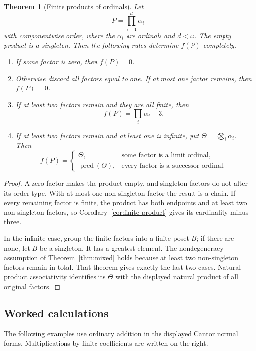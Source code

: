 \documentclass[11pt,letterpaper]{article}
\newtheorem{theorem}{Theorem}[section]
\theoremstyle{definition}
\theoremstyle{remark}
\newcommand{\pred}{\operatorname{pred}}
\begin{document}
\begin{theorem}[Finite products of ordinals]\label{thm:boxes}
Let
\[
 P=\prod_{i=1}^d\alpha_i
\]
with componentwise order, where the $\alpha_i$ are ordinals and $d<\omega$.
The empty product is a singleton. Then the following rules determine
$f(P)$ completely.
\begin{enumerate}[label=(\arabic*)]
\item If some factor is zero, then $f(P)=0$.
\item Otherwise discard all factors equal to one. If at most one factor
remains, then $f(P)=0$.
\item If at least two factors remain and they are all finite, then
\[
 f(P)=\prod_i\alpha_i-3.
\]
\item If at least two factors remain and at least one is infinite, put
$\Theta=\bigotimes_i\alpha_i$. Then
\[
 f(P)=
 \begin{cases}
  \Theta,&\text{some factor is a limit ordinal},\\
  \pred(\Theta),&\text{every factor is a successor ordinal}.
 \end{cases}
\]
\end{enumerate}
\end{theorem}
\begin{proof}
A zero factor makes the product empty, and singleton factors do not alter
its order type. With at most one non-singleton factor the result is a
chain. If every remaining factor is finite, the product has both endpoints
and at least two non-singleton factors, so Corollary~\ref{cor:finite-product}
gives its cardinality minus three.

In the infinite case, group the finite factors into a finite poset $B$;
if there are none, let $B$ be a singleton. It has a greatest element. The
nondegeneracy assumption of Theorem~\ref{thm:mixed} holds because at least
two non-singleton factors remain in total. That theorem gives exactly the
last two cases. Natural-product associativity identifies its $\Theta$
with the displayed natural product of all original factors.
\end{proof}

\subsection{Worked calculations}
The following examples use ordinary addition in the displayed Cantor
normal forms. Multiplications by finite coefficients are written on the
right.
\end{document}
